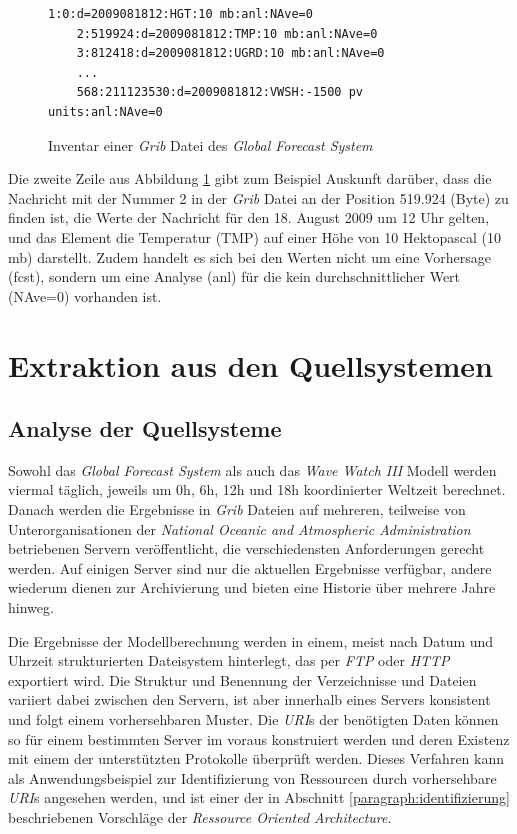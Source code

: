 \begin{figure}[h]
  \begin{Verbatim}[frame=lines,framerule=0.5pt,framesep=3mm]
    1:0:d=2009081812:HGT:10 mb:anl:NAve=0
    2:519924:d=2009081812:TMP:10 mb:anl:NAve=0
    3:812418:d=2009081812:UGRD:10 mb:anl:NAve=0
    ...
    568:211123530:d=2009081812:VWSH:-1500 pv units:anl:NAve=0
  \end{Verbatim}
  \caption{Inventar einer \textit{Grib} Datei des \textit{Global
      Forecast System} }
  \label{abbildung:inventar}
\end{figure}

Die zweite Zeile aus Abbildung \ref{abbildung:inventar} gibt zum
Beispiel Auskunft darüber, dass die Nachricht mit der Nummer 2 in der
\textit{Grib} Datei an der Position 519.924 (Byte) zu finden ist, die
Werte der Nachricht für den 18. August 2009 um 12 Uhr gelten, und das
Element die Temperatur (TMP) auf einer Höhe von 10 Hektopascal (10 mb)
darstellt. Zudem handelt es sich bei den Werten nicht um eine
Vorhersage (fcst), sondern um eine Analyse (anl) für die kein
durchschnittlicher Wert (NAve=0) vorhanden ist.

\section{Extraktion aus den Quellsystemen}

\subsection{Analyse der Quellsysteme}

Sowohl das \textit{Global Forecast System} als auch das \textit{Wave
  Watch III} Modell werden viermal täglich, jeweils um 0h, 6h, 12h und
18h koordinierter Weltzeit berechnet. Danach werden die Ergebnisse in
\textit{Grib} Dateien auf mehreren, teilweise von Unterorganisationen
der \textit{National Oceanic and Atmospheric Administration}
betriebenen Servern veröffentlicht, die verschiedensten Anforderungen
gerecht werden. Auf einigen Server sind nur die aktuellen Ergebnisse
verfügbar, andere wiederum dienen zur Archivierung und bieten eine
Historie über mehrere Jahre hinweg.

Die Ergebnisse der Modellberechnung werden in einem, meist nach Datum
und Uhrzeit strukturierten Dateisystem hinterlegt, das per
\textit{FTP} oder \textit{HTTP} exportiert wird. Die Struktur und
Benennung der Verzeichnisse und Dateien variiert dabei zwischen den
Servern, ist aber innerhalb eines Servers konsistent und folgt einem
vorhersehbaren Muster. Die \textit{URI}s der benötigten Daten können
so für einem bestimmten Server im voraus konstruiert werden und deren
Existenz mit einem der unterstützten Protokolle überprüft
werden. Dieses Verfahren kann als Anwendungsbeispiel zur
Identifizierung von Ressourcen durch vorhersehbare \textit{URI}s
angesehen werden, und ist einer der in Abschnitt
\ref{paragraph:identifizierung} beschriebenen Vorschläge der
\textit{Ressource Oriented Architecture}.

